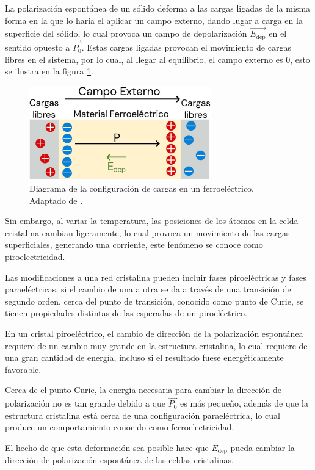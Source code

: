 \documentclass[../main.tex]{subfiles}
\begin{document}
La polarización espontánea de un sólido deforma a las cargas ligadas de la misma forma en la que lo haría el aplicar un campo externo, dando lugar a carga en la superficie del sólido, lo cual provoca un campo de depolarización $\vec{E_\text{dep}}$ en el sentido opuesto a $\vec{P_0}$. Estas cargas ligadas provocan el movimiento de cargas libres en el sistema, por lo cual, al llegar al equilibrio, el campo externo es 0, esto se ilustra en la figura \ref{fig:ferroelecdiag}.
\begin{figure}[H]
    \centering
    \includegraphics[width=0.7\textwidth]{fig/ferroelecdiag.jpg}
    \caption{Diagrama de la configuración de cargas en un ferroeléctrico. Adaptado de \cite{Qiao2021}.}
    \label{fig:ferroelecdiag}
\end{figure}
Sin embargo, al variar la temperatura, las posiciones de los átomos en la celda cristalina cambian ligeramente, lo cual provoca un movimiento de las cargas superficiales, generando una corriente, este fenómeno se conoce como piroelectricidad.

Las modificaciones a una red cristalina pueden incluir fases piroeléctricas y fases paraeléctricas, si el cambio de una a otra se da a través de una transición de segundo orden, cerca del punto de transición, conocido como punto de Curie, se tienen propiedades distintas de las esperadas de un piroeléctrico.

En un cristal piroeléctrico, el cambio de dirección de la polarización espontánea requiere de un cambio muy grande en la estructura cristalina, lo cual requiere de una gran cantidad de energía, incluso si el resultado fuese energéticamente favorable.

Cerca de el punto Curie, la energía necesaria para cambiar la dirección de polarización no es tan grande debido a que $\vec{P_{0}}$ es más pequeño, además de que la estructura cristalina está cerca de una configuración paraeléctrica, lo cual produce un comportamiento conocido como ferroelectricidad.

El hecho de que esta deformación sea posible hace que $E_\text{dep}$ pueda cambiar la dirección de polarización espontánea de las celdas cristalinas.
\end{document}
